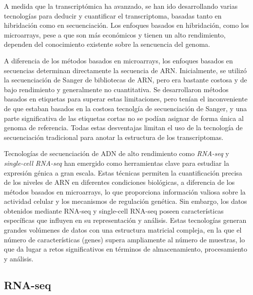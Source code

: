 A medida que la transcriptómica ha avanzado, se han ido desarrollando varias tecnologías para deducir y cuantificar el transcriptoma, basadas
tanto en hibridación como en secuenciación. Los enfoques basados en hibridación, como los microarrays, pese a que son más económicos y 
tienen un alto rendimiento, dependen del conocimiento existente sobre la sencuencia del genoma. \newline

A diferencia de los métodos basados en microarrays, los enfoques basados en secuencias determinan directamente la secuencia de ARN. Inicialmente, se utilizó
la secuenciación de Sanger de bibliotecas de ARN, pero era bastante costosa y de bajo rendimiento y generalmente no cuantitativa. Se 
desarrollaron métodos basados en etiquetas para superar estas limitaciones, pero tenían el inconveniente de que estaban basados en la 
costosa tecnolgía de secuenciación de Sanger, y una parte significativa de las etiquetas cortas no se podían asignar de forma única al
genoma de referencia. Todas estas desventajas limitan el uso de la tecnología de secuenciación tradicional para anotar la estructura de los 
transcriptomas\cite{transcriptomics-1}. \newline    


Tecnologías de secuenciación de ADN de alto rendimiento como \textit{RNA-seq} y \textit{single-cell RNA-seq} han emergido como herramientas 
clave para estudiar la expresión génica a gran escala. Estas técnicas permiten la cuantificación precisa de los niveles de ARN en diferentes 
condiciones biológicas, a diferencia de los métodos basados en microarrays, lo que proporciona información valiosa sobre la actividad celular 
y los mecanismos de regulación genética. Sin embargo, los datos obtenidos mediante RNA-seq y single-cell RNA-seq poseen características 
específicas que influyen en su representación y análisis. Estas tecnologías generan grandes volúmenes de datos con una estructura 
matricial compleja, en la que el número de características (genes) supera ampliamente al número de muestras, lo que da lugar a retos 
significativos en términos de almacenamiento, procesamiento y análisis.

\subsection{RNA-seq}

